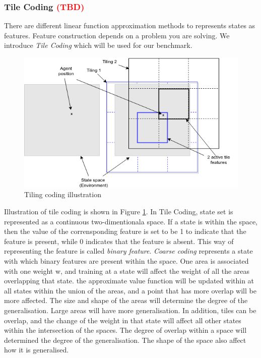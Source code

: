 \documentclass[11pt,twoside]{report}
\theoremstyle{plain}
\theoremstyle{definition}
\begin{document}
\subsubsection{Tile Coding \textcolor{red}{(TBD)}}
There are different linear function approximation methods to represents states as features. Feature construction depends on a problem you are solving.  We introduce \textit{Tile Coding} which will be used for our benchmark.
\begin{figure}[!htb]
\centering
\includegraphics[width=1.0\textwidth]{./figures/tile_coding}
\caption{Tiling coding illustration}
\label{fig:tile_coding}
\end{figure}

Illustration of tile coding is shown in Figure \ref{fig:tile_coding}. In Tile Coding, state set is represented as a continuous two-dimentionala space. If a state is within the space, then the value of the  corrensponding feature is set to be 1 to indicate that the feature is present, while 0 indicates that the feature is absent. This way of representing the feature is called \textit{binary feature}.  \textit{Coarse coding} represents a state with which binary features are present within the space.
One area is associated with one weight w, and training at a state will affect the weight of all the areas overlapping that state. the approximate value function will be updated within at all states within the union of the areas, and a point that has more overlap will be more affected.
The size and shape of the areas will determine the degree of the generalisation. Large areas will have more generalisation. In addition, tiles can be overlap, and the change of the weight in that state will affect all other states within the intersection of the spaces. 
The degree of overlap within a space will determined the degree of the generalisation.
The shape of the space also affect how it is generalised.
\end{document}
